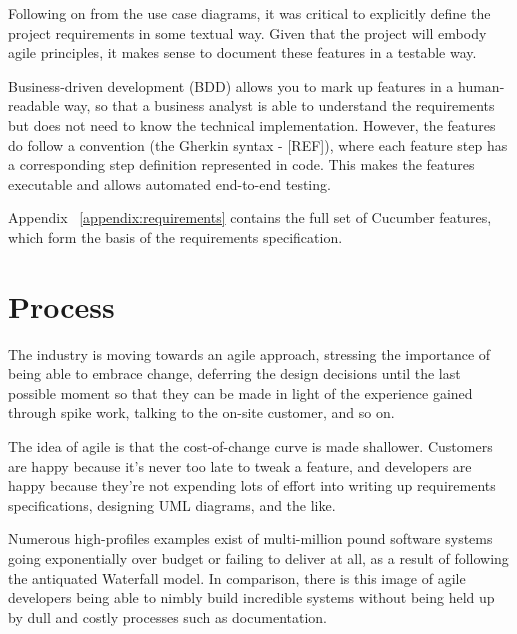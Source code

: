 Following on from the use case diagrams, it was critical to explicitly define the project requirements in some textual way. Given that the project will embody agile principles, it makes sense to document these features in a testable way.

Business-driven development (BDD) allows you to mark up features in a human-readable way, so that a business analyst is able to understand the requirements but does not need to know the technical implementation. However, the features do follow a convention (the Gherkin syntax - [REF]), where each feature step has a corresponding step definition represented in code. This makes the features executable and allows automated end-to-end testing.

Appendix ~\ref{appendix:requirements} contains the full set of Cucumber features, which form the basis of the requirements specification.

\section{Process} %

The industry is moving towards an agile approach, stressing the importance of being able to embrace change, deferring the design decisions until the last possible moment so that they can be made in light of the experience gained through spike work, talking to the on-site customer, and so on.

The idea of agile is that the cost-of-change curve is made shallower. Customers are happy because it's never too late to tweak a feature, and developers are happy because they're not expending lots of effort into writing up requirements specifications, designing UML diagrams, and the like.

Numerous high-profiles examples exist of multi-million pound software systems going exponentially over budget or failing to deliver at all, as a result of following the antiquated Waterfall model. In comparison, there is this image of agile developers being able to nimbly build incredible systems without being held up by dull and costly processes such as documentation.


